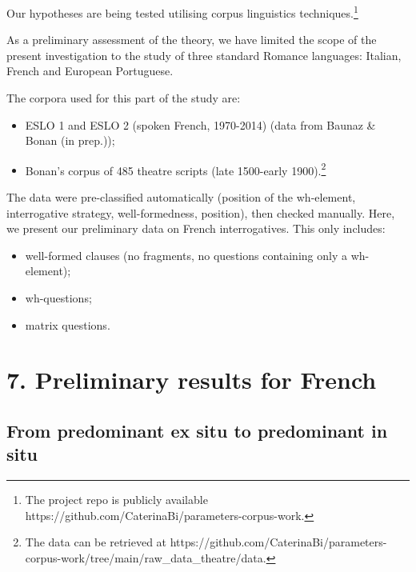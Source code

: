 \documentclass[fleqn,10pt]{wlscirep}
\begin{document}
Our hypotheses are being tested utilising corpus linguistics techniques.\footnote{The project repo is publicly available https://github.com/CaterinaBi/parameters-corpus-work.}
 
As a preliminary assessment of the theory, we have limited the scope of the present investigation to the study of three standard Romance languages: Italian, French and European Portuguese. 

\noindent The corpora used for this part of the study are: 

\begin{itemize}
\item[\ding{227}] \vspace*{-2mm} ESLO 1 and ESLO 2 (spoken French, 1970-2014) (data from Baunaz \& Bonan (in prep.));
\item[\ding{227}] \vspace*{-2mm} Bonan's corpus of 485 theatre scripts (late 1500-early 1900).\footnote{The data can be retrieved at https://github.com/CaterinaBi/parameters-corpus-work/tree/main/raw_data_theatre/data.}
\end{itemize}

\noindent The data were pre-classified automatically (position of the wh-element, interrogative strategy, well-formedness, position), then checked manually.
\noindent Here, we present our preliminary data on French interrogatives. This only includes:
\begin{itemize}
    \item[\ding{227}] \vspace*{-2mm} well-formed clauses (no fragments, no questions containing only a wh-element);
    \item[\ding{227}] \vspace*{-2mm} wh-questions;
    \item[\ding{227}] \vspace*{-2mm} matrix questions.
\end{itemize}

\section*{7. Preliminary results for French}

\subsection*{From predominant ex situ to predominant in situ}
\end{document}
